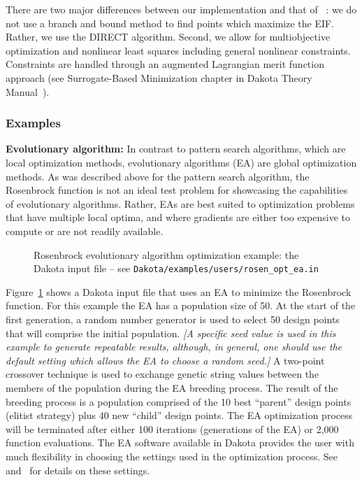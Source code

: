 There are two major differences between our implementation and that of
~\cite{Jon98}: we do not use a branch and bound method to find points
which maximize the EIF.  Rather, we use the DIRECT algorithm.  Second,
we allow for multiobjective optimization and nonlinear least squares
including general nonlinear constraints.  Constraints are handled
through an augmented Lagrangian merit function approach (see
Surrogate-Based Minimization chapter in Dakota Theory
Manual~\cite{TheoMan}).

\subsubsection{Examples}
\label{opt:methods:gradientfree:global:example}

{\bf Evolutionary algorithm:} In contrast to pattern search
algorithms, which are local optimization methods, evolutionary
algorithms (EA) are global optimization methods. As was described
above for the pattern search algorithm, the Rosenbrock function is not
an ideal test problem for showcasing the capabilities of evolutionary
algorithms. Rather, EAs are best suited to optimization problems that
have multiple local optima, and where gradients are either too
expensive to compute or are not readily available.

\begin{figure}[ht!]
  \centering
  \begin{bigbox}
    \begin{small}
    \end{small}
  \end{bigbox}
  \caption{Rosenbrock evolutionary algorithm optimization example: the
  Dakota input file --
see \texttt{Dakota/examples/users/rosen\_opt\_ea.in} }
  \label{opt:methods:gradientfree:global:example:rosenbrock_ea}
\end{figure}

Figure~\ref{opt:methods:gradientfree:global:example:rosenbrock_ea}
shows a Dakota input file that uses an EA to minimize the Rosenbrock
function. For this example the EA has a population size of 50. At the
start of the first generation, a random number generator is used to
select 50 design points that will comprise the initial
population. \emph{[A specific seed value is used in this example to
  generate repeatable results, although, in general, one should use
  the default setting which allows the EA to choose a random seed.]} A
two-point crossover technique is used to exchange genetic string
values between the members of the population during the EA breeding
process. The result of the breeding process is a population comprised
of the 10 best ``parent'' design points (elitist strategy) plus 40 new
``child'' design points. The EA optimization process will be
terminated after either 100 iterations (generations of the EA) or
2,000 function evaluations. The EA software available in Dakota
provides the user with much flexibility in choosing the settings used
in the optimization process. See~\cite{RefMan} and~\cite{Har06} for
details on these settings.

